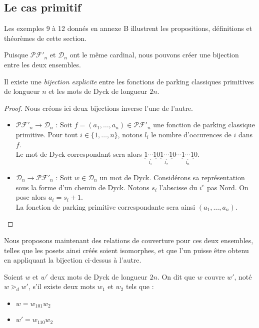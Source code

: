 \subsection{Le cas primitif}

Les exemples 9 à 12 donnés en annexe B illustrent les propositions,
définitions et théorèmes de cette section.

Puisque $\mathcal{PF'}_n$ et $\mathcal{D}_n$ ont le même cardinal,
nous pouvons créer une bijection entre les deux ensembles.

\begin{prop}
    Il existe une \emph{bijection explicite} entre les fonctions de parking
    classiques primitives de longueur $n$ et les mots de Dyck de
    longueur $2n$.
\end{prop}

\begin{proof}
    Nous créons ici deux bijections inverse l'une de l'autre.
\begin{itemize}
    \item $\mathcal{PF'}_n \to \mathcal{D}_n$ :
    Soit $f = (a_1, \ldots, a_n) \in \mathcal{PF'}_n$
    une fonction de parking classique primitive.
    Pour tout $i \in \{1, \ldots, n\}$, notons $l_i$ le nombre
    d'occurences de $i$ dans $f$.\\
    Le mot de Dyck correspondant sera alors
    $\underbrace{1 \cdots 1}_{l_1}0
     \underbrace{1 \cdots 1}_{l_2}0 \cdots
     \underbrace{1 \cdots 1}_{l_n}0$.
    
    \item $\mathcal{D}_n \to \mathcal{PF'}_n$ :
    Soit $w \in \mathcal{D}_n$ un mot de Dyck. Considérons sa
    représentation sous la forme d'un chemin de Dyck.
    Notons $s_i$ l'abscisse du $i^{e}$ pas Nord.
    On pose alors $a_i = s_i + 1$.\\
    La fonction de parking primitive correspondante sera ainsi
    $(a_1, \ldots, a_n)$.
\end{itemize}
\end{proof}

Nous proposons maintenant des relations de couverture pour ces deux
ensembles, telles que les posets ainsi créés soient isomorphes, et que 
l'un puisse être obtenu en appliquant la bijection ci-dessus à l'autre.

\begin{definition}[$\gtrdot_d$]
    Soient $w$ et $w'$ deux mots de Dyck de longueur $2n$.
    On dit que $w$ couvre $w'$, noté $w \gtrdot_d w'$, s'il existe deux
    mots $w_1$ et $w_2$ tels que :
    \begin{itemize}
        \item $w = w_101w_2$
        \item $w' = w_110w_2$
    \end{itemize}  
\end{definition}

